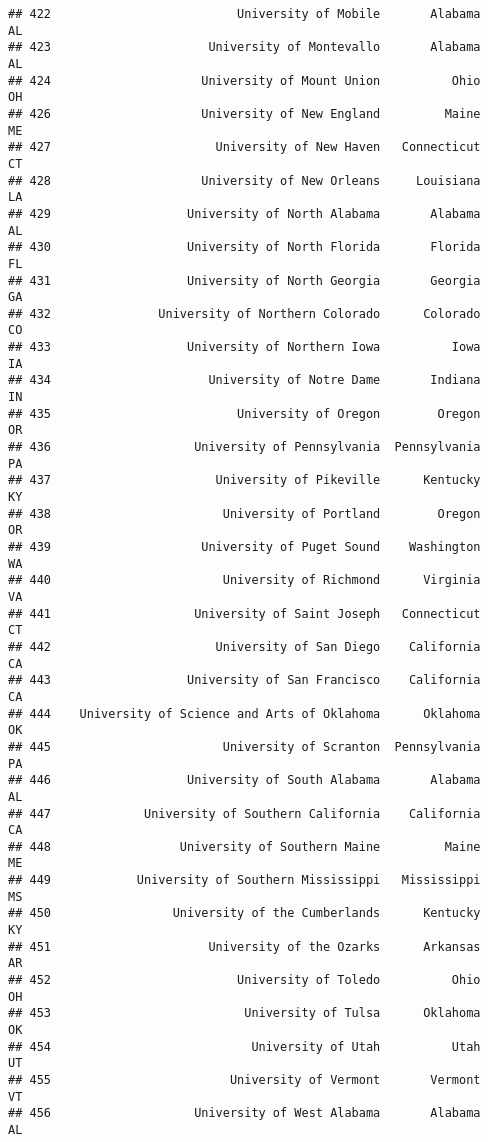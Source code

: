 \documentclass[
]{article}
\begin{document}
\begin{verbatim}
## 422                          University of Mobile       Alabama         AL
## 423                      University of Montevallo       Alabama         AL
## 424                     University of Mount Union          Ohio         OH
## 426                     University of New England         Maine         ME
## 427                       University of New Haven   Connecticut         CT
## 428                     University of New Orleans     Louisiana         LA
## 429                   University of North Alabama       Alabama         AL
## 430                   University of North Florida       Florida         FL
## 431                   University of North Georgia       Georgia         GA
## 432               University of Northern Colorado      Colorado         CO
## 433                   University of Northern Iowa          Iowa         IA
## 434                      University of Notre Dame       Indiana         IN
## 435                          University of Oregon        Oregon         OR
## 436                    University of Pennsylvania  Pennsylvania         PA
## 437                       University of Pikeville      Kentucky         KY
## 438                        University of Portland        Oregon         OR
## 439                     University of Puget Sound    Washington         WA
## 440                        University of Richmond      Virginia         VA
## 441                    University of Saint Joseph   Connecticut         CT
## 442                       University of San Diego    California         CA
## 443                   University of San Francisco    California         CA
## 444    University of Science and Arts of Oklahoma      Oklahoma         OK
## 445                        University of Scranton  Pennsylvania         PA
## 446                   University of South Alabama       Alabama         AL
## 447             University of Southern California    California         CA
## 448                  University of Southern Maine         Maine         ME
## 449            University of Southern Mississippi   Mississippi         MS
## 450                 University of the Cumberlands      Kentucky         KY
## 451                      University of the Ozarks      Arkansas         AR
## 452                          University of Toledo          Ohio         OH
## 453                           University of Tulsa      Oklahoma         OK
## 454                            University of Utah          Utah         UT
## 455                         University of Vermont       Vermont         VT
## 456                    University of West Alabama       Alabama         AL

\end{verbatim}
\end{document}
